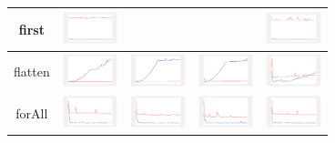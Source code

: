 \begin{longtable}{ c|c c c c}
first
&
\includegraphics[width=1.6cm]{../graphs/sequence/small/First}
&
&
&
\includegraphics[width=1.6cm]{../graphs/orderedset/small/First}
\\\hline

flatten
&
\includegraphics[width=1.6cm]{../graphs/sequence/small/Flatten}
&
\includegraphics[width=1.6cm]{../graphs/set/small/Flatten}
&
\includegraphics[width=1.6cm]{../graphs/bag/small/Flatten}
&
\includegraphics[width=1.6cm]{../graphs/orderedset/small/Flatten}
\\\hline

forAll
&
\includegraphics[width=1.6cm]{../graphs/sequence/small/forALL}
&
\includegraphics[width=1.6cm]{../graphs/set/small/forALL}
&
\includegraphics[width=1.6cm]{../graphs/bag/small/forALL}
&
\includegraphics[width=1.6cm]{../graphs/orderedset/small/forALL}
\\\hline


\end{longtable}
